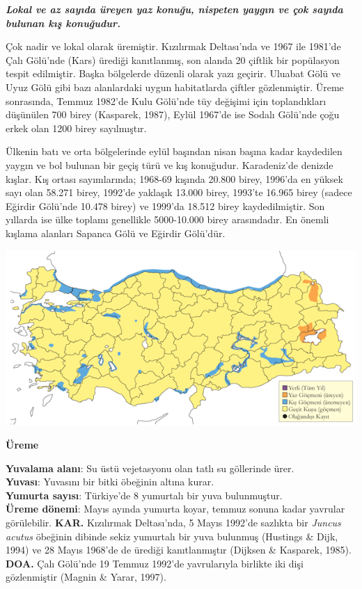 \documentclass[
  a4paper,
  DIV=11,
  numbers=noendperiod]{scrreprt}
\begin{document}
\textbf{\emph{Lokal ve az sayıda üreyen yaz konuğu, nispeten yaygın ve
çok sayıda bulunan kış konuğudur.}}

Çok nadir ve lokal olarak üremiştir. Kızılırmak Deltası'nda ve 1967 ile
1981'de Çalı Gölü'nde (Kars) ürediği kanıtlanmış, son alanda 20 çiftlik
bir popülasyon tespit edilmiştir. Başka bölgelerde düzenli olarak yazı
geçirir. Uluabat Gölü ve Uyuz Gölü gibi bazı alanlardaki uygun
habitatlarda çiftler gözlenmiştir. Üreme sonrasında, Temmuz 1982'de Kulu
Gölü'nde tüy değişimi için toplandıkları düşünülen 700 birey (Kasparek,
1987), Eylül 1967'de ise Sodalı Gölü'nde çoğu erkek olan 1200 birey
sayılmıştır.

Ülkenin batı ve orta bölgelerinde eylül başından nisan başına kadar
kaydedilen yaygın ve bol bulunan bir geçiş türü ve kış konuğudur.
Karadeniz'de denizde kışlar. Kış ortası sayımlarında; 1968-69 kışında
20.800 birey, 1996'da en yüksek sayı olan 58.271 birey, 1992'de yaklaşık
13.000 birey, 1993'te 16.965 birey (sadece Eğirdir Gölü'nde 10.478
birey) ve 1999'da 18.512 birey kaydedilmiştir. Son yıllarda ise ülke
toplamı genellikle 5000-10.000 birey arasındadır. En önemli kışlama
alanları Sapanca Gölü ve Eğirdir Gölü'dür.

\includegraphics{images/harita_Page_025.png}

\textbf{Üreme}

\textbf{Yuvalama alanı}: Su üstü vejetasyonu olan tatlı su göllerinde
ürer.\\
\textbf{Yuvası}: Yuvasını bir bitki öbeğinin altına kurar.\\
\textbf{Yumurta sayısı}: Türkiye'de 8 yumurtalı bir yuva bulunmuştur.\\
\textbf{Üreme dönemi}: Mayıs ayında yumurta koyar, temmuz sonuna kadar
yavrular görülebilir. \textbf{KAR.} Kızılırmak Deltası'nda, 5 Mayıs
1992'de sazlıkta bir \emph{Juncus acutus} öbeğinin dibinde sekiz
yumurtalı bir yuva bulunmuş (Hustings \& Dijk, 1994) ve 28 Mayıs 1968'de
de ürediği kanıtlanmıştır (Dijksen \& Kasparek, 1985). \textbf{DOA.}
Çalı Gölü'nde 19 Temmuz 1992'de yavrularıyla birlikte iki dişi
gözlenmiştir (Magnin \& Yarar, 1997).
\end{document}
